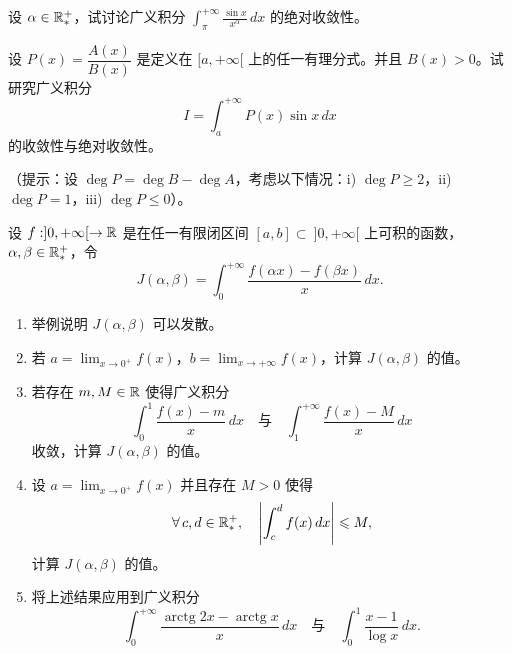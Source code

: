 \begin{exercise}
	\item 设 $\alpha\in\mathbb{R}_*^+$，试讨论广义积分 $\displaystyle\int_{\pi}^{+\infty}\frac{\sin x}{x^{\alpha}}\,dx$ 的绝对收敛性。
\end{exercise}

\begin{exercise}
	\item 设 $P(x)=\dfrac{A(x)}{B(x)}$ 是定义在 $[a,+\infty[$ 上的任一有理分式。并且 $B(x)>0$。试研究广义积分
	\[I=\int_a^{+\infty}P(x)\sin x\,dx\]
	的收敛性与绝对收敛性。

	（提示：设 $\deg P=\deg B-\deg A$，考虑以下情况：i) $\deg P\geqslant2$，ii) $\deg P=1$，iii) $\deg P\leqslant0$）。
\end{exercise}

\begin{exercise}
	\item 设 $f:]0,+\infty[\to\mathbb{R}$ 是在任一有限闭区间 $[a,b]\subset\ ]0,+\infty[$ 上可积的函数，$\alpha,\beta\in\mathbb{R}_*^+$，令
	\[J(\alpha,\beta)=\int_0^{+\infty}\frac{f(\alpha x)-f(\beta x)}{x}\,dx.\]
	\begin{enumerate}[label=\arabic*)]
		\item 举例说明 $J(\alpha,\beta)$ 可以发散。
		\item 若 $a=\displaystyle\lim_{x\to0^+}f(x)$，$b=\displaystyle\lim_{x\to+\infty}f(x)$，计算 $J(\alpha,\beta)$ 的值。
		\item 若存在 $m,M\in\mathbb{R}$ 使得广义积分
		\[\int_0^1\frac{f(x)-m}{x}\,dx\quad\text{与}\quad\int_1^{+\infty}\frac{f(x)-M}{x}\,dx\]
		收敛，计算 $J(\alpha,\beta)$ 的值。
		\item 设 $a=\displaystyle\lim_{x\to0^+}f(x)$ 并且存在 $M>0$ 使得
		\[\forall\,c,d\in\mathbb{R}_*^+,\quad\left|\int_c^df(x)\,dx\right|\leqslant M,\]
		计算 $J(\alpha,\beta)$ 的值。
		\item 将上述结果应用到广义积分
		\[\int_0^{+\infty}\frac{\operatorname{arctg}2x-\operatorname{arctg}x}{x}\,dx\quad\text{与}\quad\int_0^1\frac{x-1}{\log x}\,dx.\]
	\end{enumerate}
\end{exercise}

